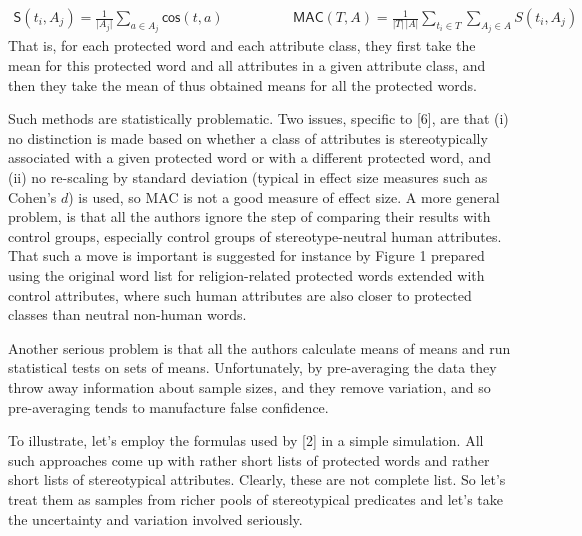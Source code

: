 \documentclass[
  12pt,
  dvipsnames,enabledeprecatedfontcommands]{scrartcl}
\begin{document}
\vspace{-2mm}

\footnotesize

\begin{align}
\mathsf{S}(t_i, A_j)  = \frac{1}{\vert A_j\vert}\sum_{a\in A_j}\mathsf{cos}(t,a) & \,\,\,\,\,\,\,\,\,\,\,\,\,\,\,\,\,\,\,\,\,\,\,\,\,
\mathsf{MAC}(T,A)  = \frac{1}{\vert T \vert \,\vert A\vert}\sum_{t_i \in T }\sum_{A_j \in A} S(t_i,A_j) \tag{MAC}
\end{align} \normalsize  \noindent That is, for each protected word and
each attribute class, they first take the mean for this protected word
and all attributes in a given attribute class, and then they take the
mean of thus obtained means for all the protected words.

Such methods are statistically problematic. Two issues, specific to
{[}6{]}, are that (i) no distinction is made based on whether a class of
attributes is stereotypically associated with a given protected word or
with a different protected word, and (ii) no re-scaling by standard
deviation (typical in effect size measures such as Cohen's \(d\)) is
used, so MAC is not a good measure of effect size. A more general
problem, is that all the authors ignore the step of comparing their
results with control groups, especially control groups of
stereotype-neutral human attributes. That such a move is important is
suggested for instance by Figure 1 prepared using the original word list
for religion-related protected words extended with control attributes,
where such human attributes are also closer to protected classes than
neutral non-human words.

Another serious problem is that all the authors calculate means of means
and run statistical tests on sets of means. Unfortunately, by
pre-averaging the data they throw away information about sample sizes,
and they remove variation, and so pre-averaging tends to manufacture
false confidence.

To illustrate, let's employ the formulas used by {[}2{]} in a simple
simulation. All such approaches come up with rather short lists of
protected words and rather short lists of stereotypical attributes.
Clearly, these are not complete list. So let's treat them as samples
from richer pools of stereotypical predicates and let's take the
uncertainty and variation involved seriously.

\noindent
\end{document}
